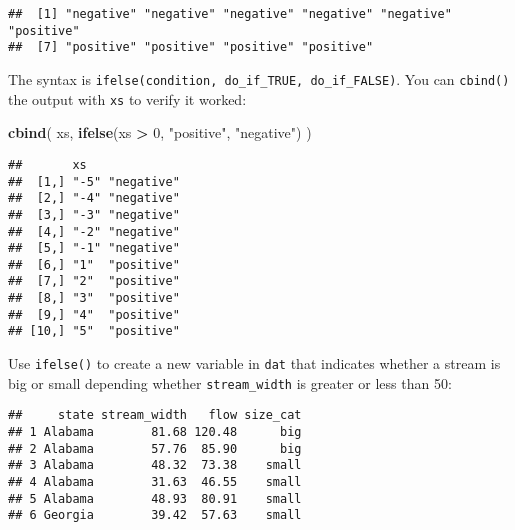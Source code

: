 \documentclass[]{book}
\newenvironment{Shaded}{\begin{snugshade}}{\end{snugshade}}
\newcommand{\KeywordTok}[1]{\textcolor[rgb]{0.13,0.29,0.53}{\textbf{#1}}}
\newcommand{\DecValTok}[1]{\textcolor[rgb]{0.00,0.00,0.81}{#1}}
\newcommand{\StringTok}[1]{\textcolor[rgb]{0.31,0.60,0.02}{#1}}
\newcommand{\OperatorTok}[1]{\textcolor[rgb]{0.81,0.36,0.00}{\textbf{#1}}}
\newcommand{\NormalTok}[1]{#1}
\theoremstyle{definition}
\theoremstyle{definition}
\theoremstyle{definition}
\theoremstyle{remark}
\begin{document}
\begin{verbatim}
##  [1] "negative" "negative" "negative" "negative" "negative" "positive"
##  [7] "positive" "positive" "positive" "positive"
\end{verbatim}

The syntax is \texttt{ifelse(condition,\ do\_if\_TRUE,\ do\_if\_FALSE)}.
You can \texttt{cbind()} the output with \texttt{xs} to verify it
worked:

\begin{Shaded}
\begin{Highlighting}[]
\KeywordTok{cbind}\NormalTok{(}
\NormalTok{  xs,}
  \KeywordTok{ifelse}\NormalTok{(xs }\OperatorTok{>}\StringTok{ }\DecValTok{0}\NormalTok{, }\StringTok{"positive"}\NormalTok{, }\StringTok{"negative"}\NormalTok{)}
\NormalTok{)}
\end{Highlighting}
\end{Shaded}

\begin{verbatim}
##       xs             
##  [1,] "-5" "negative"
##  [2,] "-4" "negative"
##  [3,] "-3" "negative"
##  [4,] "-2" "negative"
##  [5,] "-1" "negative"
##  [6,] "1"  "positive"
##  [7,] "2"  "positive"
##  [8,] "3"  "positive"
##  [9,] "4"  "positive"
## [10,] "5"  "positive"
\end{verbatim}

Use \texttt{ifelse()} to create a new variable in \texttt{dat} that
indicates whether a stream is big or small depending whether
\texttt{stream\_width} is greater or less than 50:

\begin{Shaded}
\end{Shaded}

\begin{verbatim}
##     state stream_width   flow size_cat
## 1 Alabama        81.68 120.48      big
## 2 Alabama        57.76  85.90      big
## 3 Alabama        48.32  73.38    small
## 4 Alabama        31.63  46.55    small
## 5 Alabama        48.93  80.91    small
## 6 Georgia        39.42  57.63    small
\end{verbatim}
\end{document}
